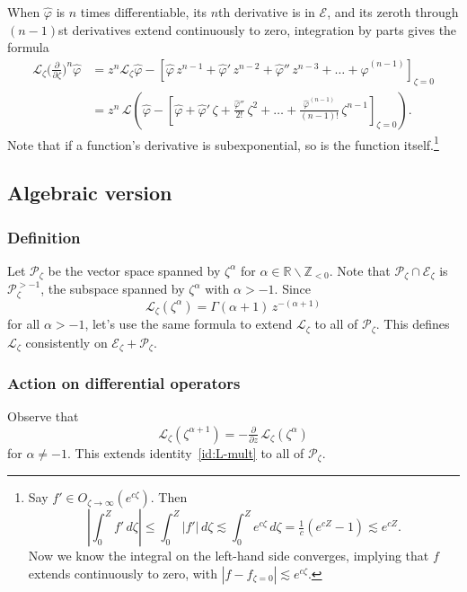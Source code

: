 \documentclass{article}
\theoremstyle{plain}
\newcommand{\Z}{\mathbb{Z}}
\newcommand{\R}{\mathbb{R}}
\newcommand{\laplace}{\mathcal{L}}
\begin{document}
\color{violet}
When $\hat{\varphi}$ is $n$ times differentiable, its $n$th derivative is in $\mathcal{E}$, and its zeroth through $(n - 1)$st derivatives extend continuously to zero, integration by parts gives the formula
\begin{align}\label{id:L-diff}
\laplace_\zeta \big(\tfrac{\partial}{\partial \zeta}\big)^n \hat{\varphi} & = z^n \laplace_\zeta \hat{\varphi} - \left[ \hat{\varphi}\,z^{n-1} + \hat{\varphi}'\,z^{n-2} + \hat{\varphi}''\,z^{n-3} + \ldots + \hat{\varphi}^{(n-1)} \right]_{\zeta = 0} \\
& = z^n\,\laplace\left( \hat{\varphi} - \left[ \hat{\varphi} + \hat{\varphi}'\,\zeta + \tfrac{\hat{\varphi}''}{2!}\,\zeta^2 + \ldots + \tfrac{\hat{\varphi}^{(n-1)}}{(n-1)!}\,\zeta^{n-1} \right]_{\zeta = 0} \right). \nonumber
\end{align}
Note that if a function's derivative is subexponential, so is the function itself.\footnote{Say $f' \in O_{\zeta \to \infty}(e^{c\zeta})$. Then \[ \left|\int_0^Z f'\,d\zeta\right| \le \int_0^Z |f'|\,d\zeta \lesssim \int_0^Z e^{c\zeta}\,d\zeta = \tfrac{1}{c}(e^{cZ} - 1) \lesssim e^{cZ}.\] Now we know the integral on the left-hand side converges, implying that $f$ extends continuously to zero, with $|f - f_{\zeta = 0}| \lesssim e^{c\zeta}$.}
\subsection{Algebraic version}
\subsubsection{Definition}
Let $\mathcal{P}_\zeta$ be the vector space spanned by $\zeta^\alpha$ for $\alpha \in \R \smallsetminus \Z_{< 0}$. Note that $\mathcal{P}_\zeta \cap \mathcal{E}_\zeta$ is $\mathcal{P}_\zeta^{> -1}$, the subspace spanned by $\zeta^\alpha$ with $\alpha > -1$. Since
\[ \laplace_\zeta(\zeta^\alpha) = \Gamma(\alpha+1)\,z^{-(\alpha + 1)} \]
for all $\alpha > -1$, let's use the same formula to extend $\laplace_\zeta$ to all of $\mathcal{P}_\zeta$. This defines $\laplace_\zeta$ consistently on $\mathcal{E}_\zeta + \mathcal{P}_\zeta$.
\subsubsection{Action on differential operators}\label{L-diff-op-alg}
Observe that
\[ \laplace_\zeta(\zeta^{\alpha + 1}) = -\tfrac{\partial}{\partial z}\,\laplace_\zeta(\zeta^\alpha) \]
for $\alpha \neq -1$. This extends identity~\ref{id:L-mult} to all of $\mathcal{P}_\zeta$.
\end{document}
